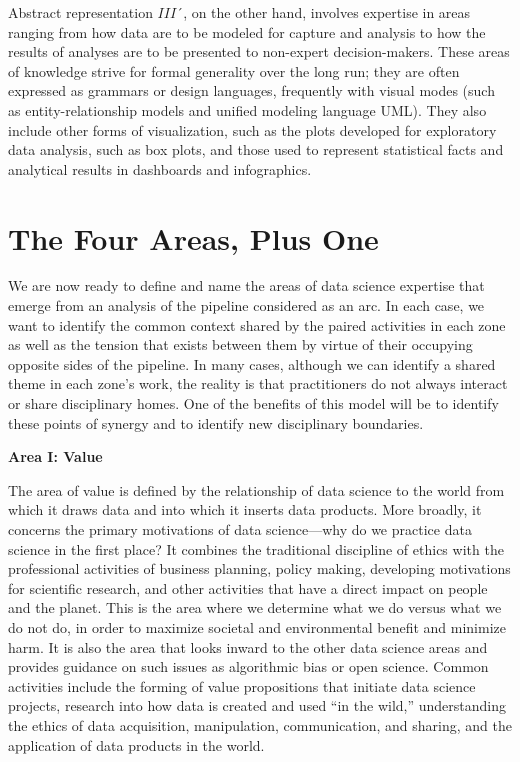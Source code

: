 \documentclass[
  letterpaper,
]{report}
\begin{document}
Abstract representation \(III´\), on the other hand, involves expertise
in areas ranging from how data are to be modeled for capture and
analysis to how the results of analyses are to be presented to
non-expert decision-makers. These areas of knowledge strive for formal
generality over the long run; they are often expressed as grammars or
design languages, frequently with visual modes (such as
entity-relationship models and unified modeling language UML). They also
include other forms of visualization, such as the plots developed for
exploratory data analysis, such as box plots, and those used to
represent statistical facts and analytical results in dashboards and
infographics.

\hypertarget{the-four-areas-plus-one}{%
\chapter{The Four Areas, Plus One}\label{the-four-areas-plus-one}}

We are now ready to define and name the areas of data science expertise
that emerge from an analysis of the pipeline considered as an arc. In
each case, we want to identify the common context shared by the paired
activities in each zone as well as the tension that exists between them
by virtue of their occupying opposite sides of the pipeline. In many
cases, although we can identify a shared theme in each zone's work, the
reality is that practitioners do not always interact or share
disciplinary homes. One of the benefits of this model will be to
identify these points of synergy and to identify new disciplinary
boundaries.

\textbf{Area I: Value}

The area of value is defined by the relationship of data science to the
world from which it draws data and into which it inserts data products.
More broadly, it concerns the primary motivations of data science---why
do we practice data science in the first place? It combines the
traditional discipline of ethics with the professional activities of
business planning, policy making, developing motivations for scientific
research, and other activities that have a direct impact on people and
the planet. This is the area where we determine what we do versus what
we do not do, in order to maximize societal and environmental benefit
and minimize harm. It is also the area that looks inward to the other
data science areas and provides guidance on such issues as algorithmic
bias or open science. Common activities include the forming of value
propositions that initiate data science projects, research into how data
is created and used ``in the wild,'' understanding the ethics of data
acquisition, manipulation, communication, and sharing, and the
application of data products in the world.
\end{document}

